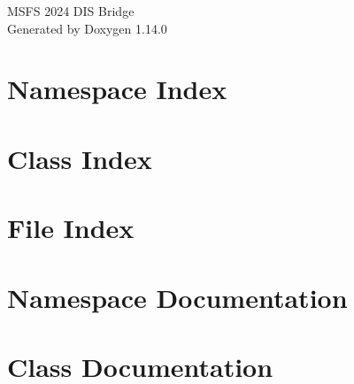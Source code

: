 \documentclass[twoside]{book}
\newcommand{\+}{\discretionary{\mbox{\scriptsize$\hookleftarrow$}}{}{}}
\newcommand{\clearemptydoublepage}{%
    \newpage{\pagestyle{empty}\cleardoublepage}%
  }
\begin{document}
  \raggedbottom
    \hypersetup{pageanchor=false,
                bookmarksnumbered=true,
                pdfencoding=unicode
               }
  \begin{titlepage}
  \vspace*{7cm}
  \begin{center}%
  {\Large MSFS 2024 DIS Bridge}\\
  \vspace*{1cm}
  {\large Generated by Doxygen 1.14.0}\\
  \end{center}
  \end{titlepage}
  \clearemptydoublepage
  \tableofcontents
  \clearemptydoublepage
  \hypersetup{pageanchor=true}


\chapter{Namespace Index}

\chapter{Class Index}

\chapter{File Index}

\chapter{Namespace Documentation}

\chapter{Class Documentation}












\end{document}
